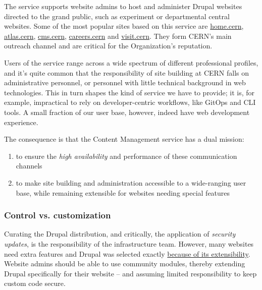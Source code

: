 The service supports website admins to host and administer Drupal websites directed to the grand public,
such as experiment or departmental central websites.
Some of the most popular sites based on this service are \href{https://home.cern/}{home.cern}, \href{https://atlas.cern}{atlas.cern},
\href{https://cms.cern}{cms.cern}, \href{https://careers.cern}{careers.cern} and \href{https://visit.cern}{visit.cern}.
They form CERN's main outreach channel and are critical for the Organization's reputation.

Users of the service range across a wide spectrum of different professional profiles,
and it's quite common that the responsibility of site building at CERN falls on administrative personnel, or personnel with little technical background in web technologies.
This in turn shapes the kind of service we have to provide; it is, for example, impractical to rely on developer-centric workflows, like GitOps and CLI tools.
A small fraction of our user base, however, indeed have web development experience.

The consequence is that the Content Management service has a dual mission:
\begin{enumerate}
    \item to ensure the \emph{high availability} and performance of these communication channels
    \item to make site building and administration accessible to a wide-ranging user base, while remaining extensible for websites needing special features
\end{enumerate}


\subsubsection*{Control vs. customization}

Curating the Drupal distribution, and critically, the application of \emph{security updates}, is the responsibility of the infrastructure team.
However, many websites need extra features and Drupal was selected exactly \hyperref[drupal-at-cern]{because of its extensibility}.
Website admins should be able to use community modules, thereby extending Drupal specifically for their website -- and assuming limited responsibility to keep custom code secure.

